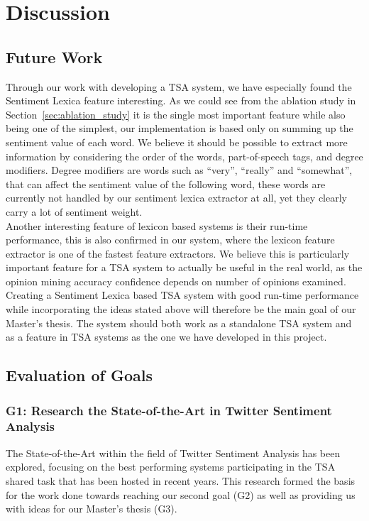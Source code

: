 \chapter{Discussion}
\label{cha:discussion}
\glsresetall


\section{Future Work}
\label{sec:future_work}
Through our work with developing a TSA system, we have especially found the Sentiment Lexica feature interesting. As we could see from the ablation study in Section~\ref{sec:ablation_study} it is the single most important feature while also being one of the simplest, our implementation is based only on summing up the sentiment value of each word. We believe it should be possible to extract more information by considering the order of the words, part-of-speech tags, and degree modifiers. Degree modifiers are words such as ``very'', ``really'' and ``somewhat'', that can affect the sentiment value of the following word, these words are currently not handled by our sentiment lexica extractor at all, yet they clearly carry a lot of sentiment weight. \\

Another interesting feature of lexicon based systems is their run-time performance, this is also confirmed in our system, where the lexicon feature extractor is one of the fastest feature extractors. We believe this is particularly important feature for a TSA system to actually be useful in the real world, as the opinion mining accuracy confidence depends on number of opinions examined. \\

Creating a Sentiment Lexica based TSA system with good run-time performance while incorporating the ideas stated above will therefore be the main goal of our Master's thesis. The system should both work as a standalone TSA system and as a feature in TSA systems as the one we have developed in this project.



\section{Evaluation of Goals}
\label{sec:evaluation}

\subsection*{G1: Research the State-of-the-Art in Twitter Sentiment Analysis}
The State-of-the-Art within the field of Twitter Sentiment Analysis has been explored, focusing on the best performing systems participating in the TSA shared task that has been hosted in recent years. This research formed the basis for the work done towards reaching our second goal (G2) as well as providing us with ideas for our Master's thesis (G3). 

